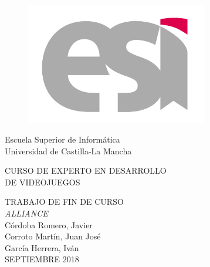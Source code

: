 \vspace*{1.5in}
\begin{center}
\vspace*{-1in}
\begin{figure}[htb]
\begin{center}
\includegraphics[width=8cm]{./images/LogoESI.jpg} 
\end{center}
\end{figure}
\end{center}
\begin{center}
Escuela Superior de Informática \\
Universidad de Castilla-La Mancha \\
\vspace*{0.8in}

\begin{Large}
CURSO DE EXPERTO EN DESARROLLO\\
DE VIDEOJUEGOS \\
\end{Large}

\vspace*{0.8in}
\begin{large}
TRABAJO DE FIN DE CURSO \\
\textit{ALLIANCE} \\

\vspace*{0.6in}
Córdoba Romero, Javier \\
Corroto Martín, Juan José\\
García Herrera, Iván\\

\vspace*{0.4in}
SEPTIEMBRE 2018
\end{large}
\end{center}